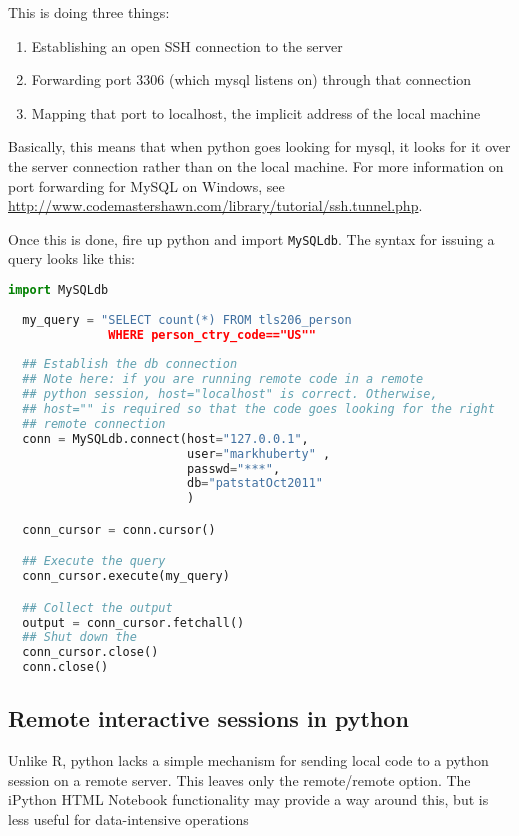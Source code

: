 \documentclass[11pt]{article}
\begin{document}
This is doing three things:
\begin{enumerate}
\item Establishing an open SSH connection to the server
\item Forwarding port 3306 (which mysql listens on) through that connection
\item Mapping that port to localhost, the implicit address of the
  local machine
\end{enumerate}

Basically, this means that when python goes looking for mysql, it
looks for it over the server connection rather than on the local
machine. For more information on port forwarding for MySQL on Windows,
see \url{http://www.codemastershawn.com/library/tutorial/ssh.tunnel.php}.

Once this is done, fire up python and import \texttt{MySQLdb}. The
syntax for issuing a query looks like this:

\begin{lstlisting}[language=python]
  import MySQLdb
  
  my_query = "SELECT count(*) FROM tls206_person 
              WHERE person_ctry_code=="US""
  
  ## Establish the db connection
  ## Note here: if you are running remote code in a remote
  ## python session, host="localhost" is correct. Otherwise,
  ## host="" is required so that the code goes looking for the right
  ## remote connection
  conn = MySQLdb.connect(host="127.0.0.1",
                         user="markhuberty" ,
                         passwd="***",
                         db="patstatOct2011"
                         )

  conn_cursor = conn.cursor()

  ## Execute the query
  conn_cursor.execute(my_query)

  ## Collect the output
  output = conn_cursor.fetchall()
  ## Shut down the 
  conn_cursor.close()
  conn.close()  
\end{lstlisting}

\subsection{Remote interactive sessions in python}
\label{sec:remote-inter-sess}

Unlike R, python lacks a simple mechanism for sending local code to a
python session on a remote server. This leaves only the remote/remote
option. The iPython HTML Notebook functionality may provide a way
around this, but is less useful for data-intensive operations
\end{document}
